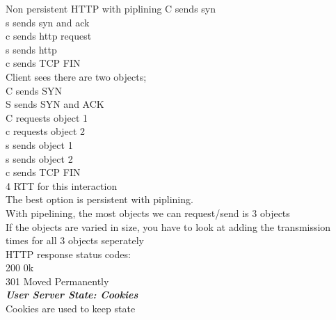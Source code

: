 Non persistent HTTP with piplining
C sends syn\\
s sends syn and ack\\
c sends http request\\
s sends http \\
c sends TCP FIN\\
Client sees there are two objects;\\
C sends SYN\\
S sends SYN and ACK\\
C requests object 1\\
c requests object 2\\
s sends object 1 \\
s sends object 2\\
c sends TCP FIN\\
4 RTT for this interaction\\

The best option is persistent with piplining.\\
With pipelining, the most objects we can request/send is 3 objects\\

If the objects are varied in size, you have to look at adding the transmission times for all 3 objects seperately\\

HTTP response status codes:\\
200 0k\\
301 Moved Permanently\\



\noindent\large{\bf \textit{User Server State: Cookies}}\\
Cookies are used to keep state\\
